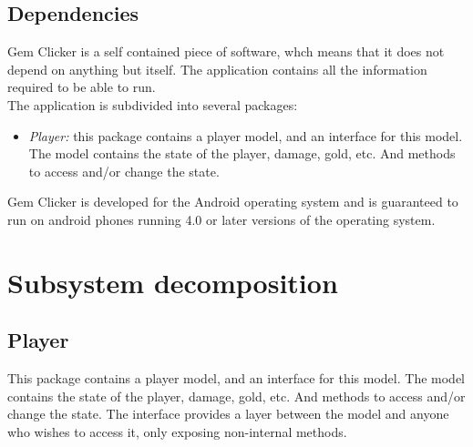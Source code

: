 \documentclass{article}
\begin{document}
\subsection{Dependencies}
Gem Clicker is a self contained piece of software, whch means that it does not
depend on anything but itself. The application contains all the information 
required to be able to run. \\

\noindent
The application is subdivided into several packages:
\begin{itemize}
    \item \emph{Player:} this package contains a player model, and an interface for this model. The model contains the state of the player, damage, gold, etc. And methods to access and/or change the state.
\end{itemize}

\noindent
Gem Clicker is developed for the Android operating system and is guaranteed to
run on android phones running 4.0 or later versions of the operating system.  

\section{Subsystem decomposition}

\subsection{Player}
    This package contains a player model, and an interface for this model. The model contains the state of the player, damage, gold, etc. And methods to access and/or change the state. The interface provides a layer between the model and anyone who wishes to access it, only exposing non-internal methods.
\newpage
\end{document}
